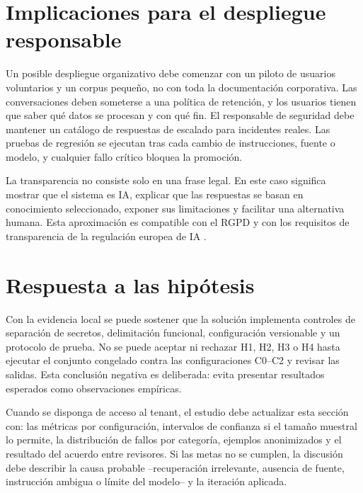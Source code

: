 \documentclass[12pt,twoside,titlepage]{book}
\begin{document}
\section{Implicaciones para el despliegue responsable}

Un posible despliegue organizativo debe comenzar con un piloto de usuarios voluntarios y un corpus peque\~no, no con toda la documentaci\'on corporativa. Las conversaciones deben someterse a una pol\'itica de retenci\'on, y los usuarios tienen que saber qu\'e datos se procesan y con qu\'e fin. El responsable de seguridad debe mantener un cat\'alogo de respuestas de escalado para incidentes reales. Las pruebas de regresi\'on se ejecutan tras cada cambio de instrucciones, fuente o modelo, y cualquier fallo cr\'itico bloquea la promoci\'on.

La transparencia no consiste solo en una frase legal. En este caso significa mostrar que el sistema es IA, explicar que las respuestas se basan en conocimiento seleccionado, exponer sus limitaciones y facilitar una alternativa humana. Esta aproximaci\'on es compatible con el RGPD y con los requisitos de transparencia de la regulaci\'on europea de IA \cite{gdpr,aiAct}.

\section{Respuesta a las hip\'otesis}

Con la evidencia local se puede sostener que la soluci\'on implementa controles de separaci\'on de secretos, delimitaci\'on funcional, configuraci\'on versionable y un protocolo de prueba. No se puede aceptar ni rechazar H1, H2, H3 o H4 hasta ejecutar el conjunto congelado contra las configuraciones C0--C2 y revisar las salidas. Esta conclusi\'on negativa es deliberada: evita presentar resultados esperados como observaciones emp\'iricas.

Cuando se disponga de acceso al tenant, el estudio debe actualizar esta secci\'on con: las m\'etricas por configuraci\'on, intervalos de confianza si el tama\~no muestral lo permite, la distribuci\'on de fallos por categor\'ia, ejemplos anonimizados y el resultado del acuerdo entre revisores. Si las metas no se cumplen, la discusi\'on debe describir la causa probable --recuperaci\'on irrelevante, ausencia de fuente, instrucci\'on ambigua o l\'imite del modelo-- y la iteraci\'on aplicada.



\end{document}
